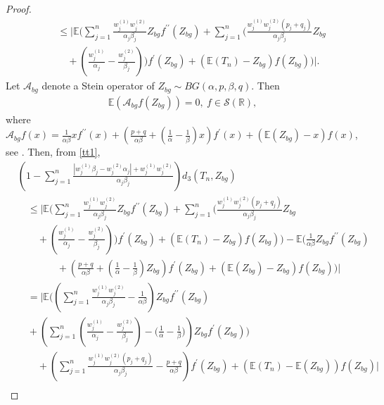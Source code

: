 \documentclass[12pt, a4paper,reqno]{amsart}
\theoremstyle{definition}
\theoremstyle{myremark}
\numberwithin{equation}{section}
\begin{document}
\begin{proof}
\begin{align}
\nonumber	&\quad \leq\bigg| \mathbb{E}\bigg(	\sum_{j=1}^{n}\frac{w_{j}^{(1)}w_{j}^{(2)}}{\alpha_j \beta_j}Z_{bg}f^{\prime\prime}(Z_{bg})+ \sum_{j=1}^{n}\bigg(\frac{w_{j}^{(1)}w_{j}^{(2)}(p_j+q_j)}{\alpha_j \beta_j}Z_{bg}\\
	&\quad\quad+ \left(\frac{w_{j}^{(1)} }{\alpha_j}-\frac{w_{j}^{(2)}}{\beta_j} \right)\bigg)f^{\prime}(Z_{bg})+\left(  \mathbb{E}(T_n) -Z_{bg} \right)f(Z_{bg})  \bigg)\bigg|.\label{tt1}
	\end{align}
\noindent
Let $\mathcal{A}_{bg}$ denote a Stein operator of $Z_{bg}\sim BG(\alpha,p,\beta,q)$. Then
\begin{align}
	\mathbb{E}\left(\mathcal{A}_{bg}f(Z_{bg}) \right)=0,~f\in \mathcal{S}(\mathbb{{R}}),
\end{align}	
where $\mathcal{A}_{bg}f(x)=\frac{1}{\alpha \beta}xf^{\prime\prime}(x)+ \left(\frac{p+q}{\alpha\beta}+ \left(\frac{1}{\alpha}-\frac{1}{\beta} \right)x   \right)f^{\prime}(x)+\left(  \mathbb{E}(Z_{bg}) -x \right)f(x)$, see \cite[Example 5.3]{BUV1}. Then, from \eqref{tt1},
\begin{align}
\nonumber&\left(1 - \sum_{j=1}^{n}\frac{|w_{j}^{(1)}\beta_j-w_{j}^{(2)}\alpha_j|+w_j^{(1)} w_j^{(2)}}{\alpha_j \beta_j} \right)d_{3}(T_n,Z_{bg})\\	
\nonumber	&\quad \leq\bigg| \mathbb{E}\bigg(	\sum_{j=1}^{n}\frac{w_{j}^{(1)}w_{j}^{(2)}}{\alpha_j \beta_j}Z_{bg}f^{\prime\prime}(Z_{bg})+ \sum_{j=1}^{n}\bigg(\frac{w_{j}^{(1)}w_{j}^{(2)}(p_j+q_j)}{\alpha_j \beta_j}Z_{bg}\\
\nonumber	&\quad\quad+ \left(\frac{w_{j}^{(1)} }{\alpha_j}-\frac{w_{j}^{(2)}}{\beta_j} \right)\bigg)f^{\prime}(Z_{bg})+\left(  \mathbb{E}(T_n) -Z_{bg} \right)f(Z_{bg})  \bigg)- \mathbb{E}\bigg(\frac{1}{\alpha \beta}Z_{bg}f^{\prime\prime}(Z_{bg})\\
\nonumber&\quad\quad\quad\quad+ \left(\frac{p+q}{\alpha\beta}+ \left(\frac{1}{\alpha}-\frac{1}{\beta} \right)Z_{bg}   \right)f^{\prime}(Z_{bg})+\left(  \mathbb{E}(Z_{bg}) -Z_{bg} \right)f(Z_{bg})  \bigg) \bigg|\\
\nonumber&\quad=\bigg|\mathbb{E}\bigg( \left( \sum_{j=1}^{n}\frac{w_{j}^{(1)}w_{j}^{(2)} }{\alpha_j \beta_j}- \frac{1}{\alpha \beta} \right)Z_{bg}f^{\prime\prime}(Z_{bg}) \\
\nonumber &\quad+ \left(\sum_{j=1}^{n}\left(\frac{w_{j}^{(1)} }{\alpha_j}-\frac{w_{j}^{(2)}}{\beta_j} \right)  -\bigg(\frac{1}{\alpha}-\frac{1}{\beta}\bigg)\right)Z_{bg}f^{\prime}(Z_{bg}) \bigg) \\
\nonumber&\quad\quad+\left( \sum_{j=1}^{n}\frac{w_{j}^{(1)}w_{j}^{(2)}(p_j+q_j)}{\alpha_j \beta_j} -\frac{p+ q}{\alpha \beta} \right)f^{\prime}(Z_{bg})+ \left(\mathbb{E}(T_n) -\mathbb{E}(Z_{bg}) \right)f(Z_{bg}) \bigg|\\

\end{align}
\end{proof}
\end{document}
